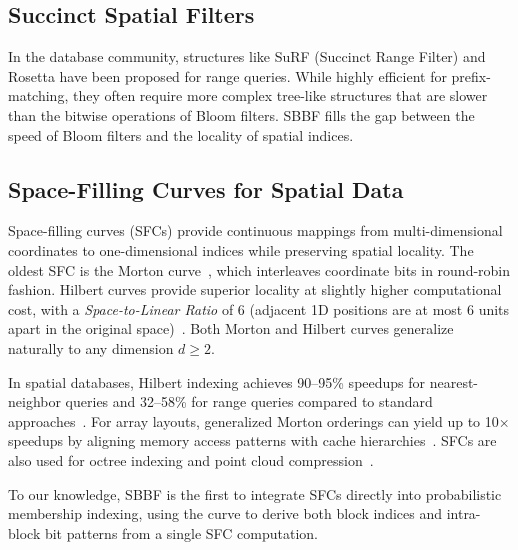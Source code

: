 \documentclass[conference,a4paper]{IEEEtran}
\begin{document}
\subsection{Succinct Spatial Filters}
In the database community, structures like SuRF (Succinct Range Filter) and Rosetta have been proposed for range queries. While highly efficient for prefix-matching, they often require more complex tree-like structures that are slower than the bitwise operations of Bloom filters. SBBF fills the gap between the speed of Bloom filters and the locality of spatial indices.


\subsection{Space-Filling Curves for Spatial Data}
Space-filling curves (SFCs) provide continuous mappings from multi-dimensional coordinates to one-dimensional indices while preserving spatial locality. The oldest SFC is the Morton curve~\citep{Morton1966}, which interleaves coordinate bits in round-robin fashion. Hilbert curves provide superior locality at slightly higher computational cost, with a \emph{Space-to-Linear Ratio} of 6 (adjacent 1D positions are at most 6 units apart in the original space)~\citep{Chen2022Hilbert}. Both Morton and Hilbert curves generalize naturally to any dimension $d \geq 2$.

In spatial databases, Hilbert indexing achieves 90--95\% speedups for nearest-neighbor queries and 32--58\% for range queries compared to standard approaches~\citep{Ujang2014}. For array layouts, generalized Morton orderings can yield up to 10$\times$ speedups by aligning memory access patterns with cache hierarchies~\citep{Swatman2024}. SFCs are also used for octree indexing and point cloud compression~\citep{Chen2022}.

To our knowledge, SBBF is the first to integrate SFCs directly into probabilistic membership indexing, using the curve to derive both block indices and intra-block bit patterns from a single SFC computation.
\end{document}
